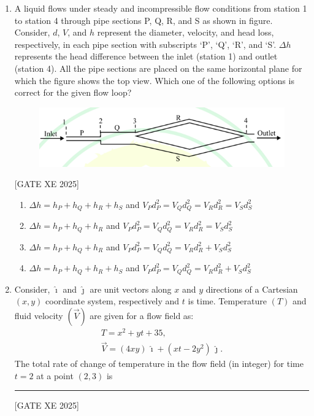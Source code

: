 \documentclass[journal,12pt,onecolumn]{IEEEtran}
\theoremstyle{remark}
\begin{document}
\begin{enumerate}
\item A liquid flows under steady and incompressible flow conditions from station 1 to station 4 through pipe sections P, Q, R, and S as shown in figure. Consider, $d$, $V$, and $h$ represent the diameter, velocity, and head loss, respectively, in each pipe section with subscripts ‘P’, ‘Q’, ‘R’, and ‘S’. $\Delta h$ represents the head difference between the inlet (station 1) and outlet (station 4). All the pipe sections are placed on the same horizontal plane for which the figure shows the top view. Which one of the following options is correct for the given flow loop? \label{q:35}

\begin{figure}[H]
    \centering
    \includegraphics[width=0.5\columnwidth]{figs/fig9.png}
    \caption{}
    \label{fig:placeholder}
\end{figure}


\hfill[GATE XE 2025]


\begin{enumerate}
\item $\Delta h=h_P+h_Q+h_R+h_S$ and $V_P d_P^2=V_Q d_Q^2=V_R d_R^2=V_S d_S^2$
\item $\Delta h=h_P+h_Q+h_R$ and $V_P d_P^2=V_Q d_Q^2=V_R d_R^2=V_S d_S^2$
\item $\Delta h=h_P+h_Q+h_R$ and $V_P d_P^2=V_Q d_Q^2=V_R d_R^2+V_S d_S^2$
\item $\Delta h=h_P+h_Q+h_R+h_S$ and $V_P d_P^2=V_Q d_Q^2=V_R d_R^2+V_S d_S^2$
\end{enumerate}



\item Consider, $\hat{\imath}$ and $\hat{\jmath}$ are unit vectors along $x$ and $y$ directions of a Cartesian $(x,y)$ coordinate system, respectively and $t$ is time. Temperature $(T)$ and fluid velocity $(\vec{V})$ are given for a flow field as:
\begin{align}
    T=x^2+yt+35,\\ 
    \vec{V}=(4xy)\,\hat{\imath}+(xt-2y^2)\,\hat{\jmath}.
\end{align}
The total rate of change of temperature in the flow field (in integer) for time $t=2$ at a point $(2,3)$ is \rule{3cm}{0.15mm} \label{q:36}

\hfill[GATE XE 2025]



\end{enumerate}
\end{document}
